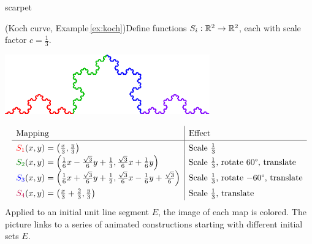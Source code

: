 \begin{examples}{}{scarpet}
\begin{enumerate}
		\begin{minipage}[t]{0.65\linewidth}\vspace{0pt}
			\item (Koch curve, Example\,\ref{ex:koch})\lstsp Define functions $S_i:\mathbb{R}^2\to\mathbb{R}^2$, each with scale factor $c=\frac 13$.
		\end{minipage}
		\hfill
		\begin{minipage}[t]{0.34\linewidth}\vspace{0pt}
			\flushright \href{http://www.math.uci.edu/~ndonalds/math161/koch-anim2.html}{\includegraphics[scale=0.95]{koch3}}
		\end{minipage}\par
		\vspace{-27pt}
		\[
			\renewcommand\arraystretch{1.4}
			\begin{array}{l|l}
				\text{Mapping}&\text{Effect}\\\hline
				\displaystyle \textcolor{red}{S_1}(x,y)=\left(\tfrac x3,\tfrac y3\right)
				&
				\text{Scale $\frac 13$}
				\\
				\displaystyle \textcolor{Green}{S_2}(x,y)=\left(\tfrac 16x-\tfrac{\sqrt 3}6y+\tfrac 13,\tfrac{\sqrt 3}6x+\tfrac 16y\right)
				&
				\text{Scale $\frac 13$, rotate \ang{60}, translate}
				\\
				\displaystyle \textcolor{blue}{S_3}(x,y)=\left(\tfrac 16x+\tfrac{\sqrt 3}6y+\tfrac 12,\tfrac{\sqrt 3}6x-\tfrac 16y+\tfrac{\sqrt 3}6\right)
				&
				\text{Scale $\frac 13$, rotate $-\ang{60}$, translate}
				\\
				\displaystyle \textcolor{purple}{S_4}(x,y)=\left(\tfrac x3+\tfrac 23,\tfrac y3\right)
				&
				\text{Scale $\frac 13$, translate}
			\end{array}
		\]
		Applied to an initial unit line segment $E$, the image of each map is colored. The picture links to a series of animated constructions starting with different initial sets $E$.
		

\end{enumerate}
\end{examples}
